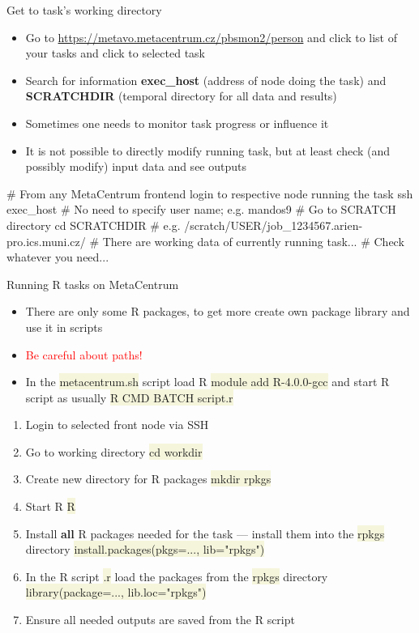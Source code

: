 \documentclass[compress, ucs, xelatex, 11pt, xcolor=svgnames, aspectratio=169,
	hyperref={
		bookmarks=true,
		unicode=true,
		colorlinks=true,
		pdftitle={Linux, command line and MetaCentrum},
		plainpages=false,
		pdfauthor={Vojtech Zeisek},
		pdfsubject={Course about use of Linux command line, writing shell scripts and using MetaCentrum of CESNET},
		pdfcreator={XeLaTeX},
		pdfkeywords={Linux, GNU, BASH, shell, command line, MetaCentrum},
		linkcolor=DarkRed, %
		anchorcolor=DarkBlue, %
		citecolor=Indigo, %
		filecolor=NavyBlue, %
		menucolor=DarkMagenta, %
		urlcolor=DarkBlue, %
		pdftex},
	url={hyphens, lowtilde} %
	]{beamer}
\renewcommand{\texttt}[1]{\colorbox{Beige}{{\ttfamily #1}}}
\renewcommand{\alert}[1]{\textcolor{red}{#1}}
\begin{document}
\begin{frame}[fragile]{Get to task's working directory}
	\begin{itemize}
		\item Go to \url{https://metavo.metacentrum.cz/pbsmon2/person} and click to list of your tasks and click to selected task
		\item Search for information \textbf{exec\_host} (address of node doing the task) and \textbf{SCRATCHDIR} (temporal directory for all data and results)
		\item Sometimes one needs to monitor task progress or influence it
		\item It is not possible to directly modify running task, but at least check (and possibly modify) input data and see outputs
	\end{itemize}
	\begin{bashcode}
    # From any MetaCentrum frontend login to respective node running the task
    ssh exec_host # No need to specify user name; e.g. mandos9
    # Go to SCRATCH directory
    cd SCRATCHDIR # e.g. /scratch/USER/job_1234567.arien-pro.ics.muni.cz/
    # There are working data of currently running task...
    # Check whatever you need...
	\end{bashcode}
\end{frame}

\begin{frame}{Running R tasks on MetaCentrum}
	\begin{itemize}
		\item There are only some R packages, to get more create own package library and use it in scripts
		\item \alert{Be careful about paths!}
		\item In the \texttt{metacentrum.sh} script load R \texttt{module add R-4.0.0-gcc} and start R script as usually \texttt{R CMD BATCH script.r}
	\end{itemize}
	\begin{enumerate}
		\item Login to selected front node via SSH
		\item Go to working directory \texttt{cd workdir}
		\item Create new directory for R packages \texttt{mkdir rpkgs}
		\item Start R \texttt{R}
		\item Install \textbf{all} R packages needed for the task --- install them into the \texttt{rpkgs} directory \texttt{install.packages(pkgs=..., lib="rpkgs")}
		\item In the R script \texttt{*.r} load the packages from the \texttt{rpkgs} directory \texttt{library(package=..., lib.loc="rpkgs")}
		\item Ensure all needed outputs are saved from the R script
	\end{enumerate}
\end{frame}
\end{document}
